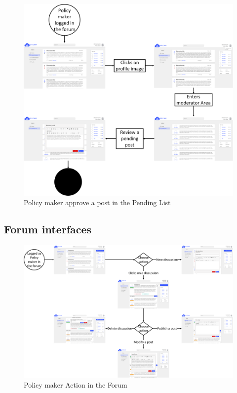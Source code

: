 \begin{figure}[h!]
        \centering
        \includegraphics[scale=0.15]{images/interfaces/pending_list_interface.png}
        \caption{Policy maker approve a post in the Pending List}
        \label{fig:policy_maker_pending_list_interface}
\end{figure}
\FloatBarrier

\newpage
\subsection{Forum interfaces}

\begin{figure}[h!]
        \centering
        \includegraphics[scale=0.12]{images/interfaces/policy_maker_action_forum_interface.png}
        \caption{Policy maker Action in the Forum}
        \label{fig:policy_maker_action_forum}
\end{figure}
\FloatBarrier

